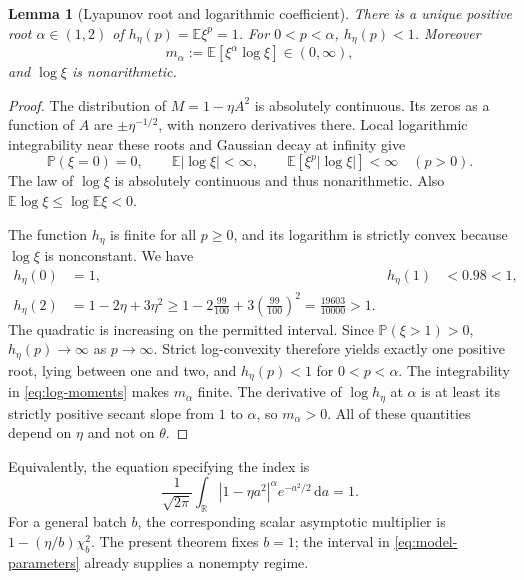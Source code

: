 \documentclass[11pt,a4paper]{article}
\numberwithin{equation}{section}
\newtheorem{lemma}[theorem]{Lemma}
\theoremstyle{remark}
\newcommand{\E}{\mathbb E}
\newcommand{\Pp}{\mathbb P}
\newcommand{\R}{\mathbb R}
\newcommand{\dd}{\,\mathrm d}
\begin{document}
\begin{lemma}[Lyapunov root and logarithmic coefficient]\label{lem:root}
There is a unique positive root $\alpha\in(1,2)$ of
$h_\eta(p)=\E\xi^p=1$. For $0<p<\alpha$, $h_\eta(p)<1$. Moreover
\begin{equation}
 m_\alpha:=\E[\xi^\alpha\log\xi]\in(0,\infty),
 \label{eq:m-alpha}
\end{equation}
and $\log\xi$ is nonarithmetic.
\end{lemma}

\begin{proof}
The distribution of $M=1-\eta A^2$ is absolutely continuous. Its zeros
as a function of $A$ are $\pm\eta^{-1/2}$, with nonzero derivatives
there. Local logarithmic integrability near these roots and Gaussian decay
at infinity give
\begin{equation}
 \Pp(\xi=0)=0,\qquad \E|\log\xi|<\infty,\qquad
 \E[\xi^p|\log\xi|]<\infty\quad(p>0).
 \label{eq:log-moments}
\end{equation}
The law of $\log\xi$ is absolutely continuous and thus nonarithmetic.
Also $\E\log\xi\le\log\E\xi<0$.

The function $h_\eta$ is finite for all $p\ge0$, and its logarithm is
strictly convex because $\log\xi$ is nonconstant. We have
\begin{align}
 h_\eta(0)&=1,& h_\eta(1)&<0.98<1,\nonumber\\
 h_\eta(2)&=1-2\eta+3\eta^2
 \ge1-2\frac{99}{100}+3\left(\frac{99}{100}\right)^2
 =\frac{19603}{10000}>1.\label{eq:second-multiplier}
\end{align}
The quadratic is increasing on the permitted interval. Since
$\Pp(\xi>1)>0$, $h_\eta(p)\to\infty$ as $p\to\infty$.
Strict log-convexity therefore yields exactly one positive root, lying
between one and two, and $h_\eta(p)<1$ for $0<p<\alpha$.
The integrability in \eqref{eq:log-moments} makes $m_\alpha$ finite.
The derivative of $\log h_\eta$ at $\alpha$ is at least its strictly
positive secant slope from $1$ to $\alpha$, so $m_\alpha>0$.
All of these quantities depend on $\eta$ and not on $\theta$.
\end{proof}

Equivalently, the equation specifying the index is
\begin{equation}
 \frac1{\sqrt{2\pi}}\int_\R |1-\eta a^2|^\alpha
            e^{-a^2/2}\dd a=1.\label{eq:alpha-integral}
\end{equation}
For a general batch $b$, the corresponding scalar asymptotic multiplier
is $1-(\eta/b)\chi_b^2$. The present theorem fixes $b=1$; the interval
in \eqref{eq:model-parameters} already supplies a nonempty regime.
\end{document}
